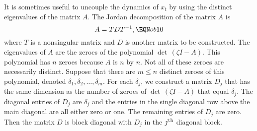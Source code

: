 It is sometimes useful  to
uncouple the  dynamics of $x_t$ by
 using the distinct eigenvalues of the matrix $A$.  The Jordan decomposition of the matrix $A$ is
$$A = TDT^{-1} , \EQN ob10 $$
where $T$ is a nonsingular matrix and $D$ is another  matrix to be constructed.
The eigenvalues of $A$ are the zeroes of the polynomial $\det\,
(\zeta I - A)$.  This polynomial has $n$
zeroes because $A$ is $n$ by $n$.  Not all of these zeroes are necessarily
distinct. Suppose that there are $m \leq n$ distinct zeroes
of this polynomial,
denoted $\delta_1, \delta_2, \ldots, \delta_m$.  For each $\delta_j$, we
construct a matrix $D_j$ that has the same dimension as the number of zeroes
of $\det\, (\zeta I - A)$ that  equal $\delta_j$.  The diagonal entries
of $D_j$ are $\delta_j$ and the entries in the single diagonal row above the
main diagonal are all either zero or one.  The remaining entries of $D_j$ are
zero.  Then the matrix $D$ is block diagonal with $D_j$ in the
$j^{\rm th}$ diagonal block.

